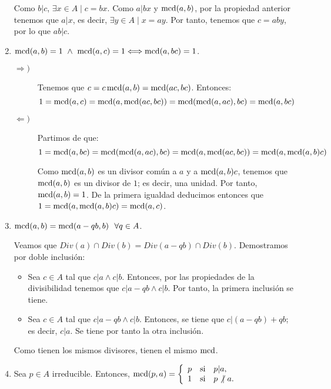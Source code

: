 \begin{enumerate}
    Como $b|c$, $\exists x\in A \mid c=bx$. Como $a|bx$ y $\operatorname{mcd}(a,b)$, por la propiedad anterior tenemos que $a|x$, es decir, $\exists y\in A\mid x=ay$. Por tanto, tenemos que $c=aby$, por lo que $ab|c$.

    \item $\operatorname{mcd}(a,b)=1 \ \land \  \operatorname{mcd}(a,c)=1 \Longleftrightarrow \operatorname{mcd}(a,bc)=1$.
    \begin{description}
        \item[$\Longrightarrow)$] Tenemos que $c=c\operatorname{mcd}(a,b)=\operatorname{mcd}(ac,bc)$. Entonces:
        \begin{equation*}
            1=\operatorname{mcd}(a,c)=\operatorname{mcd}(a,\operatorname{mcd}(ac,bc)) = \operatorname{mcd}(\operatorname{mcd}(a,ac), bc) = \operatorname{mcd}(a,bc)
        \end{equation*}

        \item[$\Longleftarrow)$] Partimos de que:
        \begin{equation*}
            1=\operatorname{mcd}(a,bc) = \operatorname{mcd}(\operatorname{mcd}(a,ac), bc) = \operatorname{mcd}(a,\operatorname{mcd}(ac,bc)) = \operatorname{mcd}(a,\operatorname{mcd}(a,b)c)
        \end{equation*}

        Como $\operatorname{mcd}(a,b)$ es  un divisor común a $a$ y a $\operatorname{mcd}(a,b)c$, tenemos que $\operatorname{mcd}(a,b)$ es un divisor de $1$; es decir, una unidad. Por tanto, $\operatorname{mcd}(a,b)=1$. De la primera igualdad deducimos entonces que $1=\operatorname{mcd}(a,\operatorname{mcd}(a,b)c) = \operatorname{mcd}(a,c)$.
    \end{description}

    \item $\operatorname{mcd}(a,b)=\operatorname{mcd}(a-qb, b)~~\forall q \in A$.

    Veamos que $Div(a)\cap Div(b)=Div(a-qb)\cap Div(b)$. Demostramos por doble inclusión:
    \begin{itemize}
        \item Sea $c\in A$ tal que $c|a\land c|b$. Entonces, por las propiedades de la divisibilidad tenemos que $c|a-qb\land c|b$. Por tanto, la primera inclusión se tiene.

        \item Sea $c\in A$ tal que $c|a-qb\land c|b$. Entonces, se tiene que $c|(a-qb)+qb$; es decir, $c|a$. Se tiene por tanto la otra inclusión.
    \end{itemize}
    Como tienen los mismos divisores, tienen el mismo $\operatorname{mcd}$.

    \item Sea $p\in A$ irreducible. Entonces, 
    $\operatorname{mcd}(p,a) = \left\{ \begin{array}{lll}
            p & \mbox{si} & p|a,      \\
            1 & \mbox{si} & p\not|~a.
        \end{array} \right.$


\end{enumerate}

